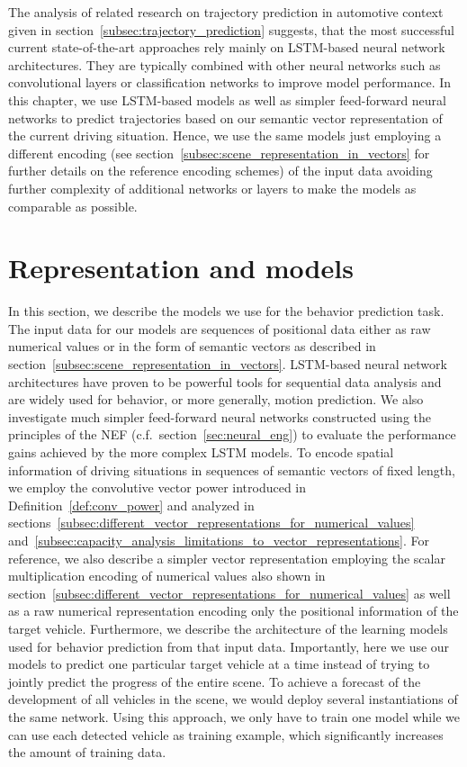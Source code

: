 The analysis of related research on trajectory prediction in automotive context given in section~\ref{subsec:trajectory_prediction} suggests, that the most successful current state-of-the-art approaches rely mainly on \ac{LSTM}-based neural network architectures.
They are typically combined with other neural networks such as convolutional layers or classification networks \parencite{Deo2018a} to improve model performance.
In this chapter, we use \ac{LSTM}-based models as well as simpler feed-forward neural networks to predict trajectories based on our semantic vector representation of the current driving situation.
Hence, we use the same models just employing a different encoding (see section~\ref{subsec:scene_representation_in_vectors} for further details on the reference encoding schemes) of the input data avoiding further complexity of additional networks or layers to make the models as comparable as possible.

\section{Representation and models}
\label{sec:repr_models}

In this section, we describe the models we use for the behavior prediction task.
The input data for our models are sequences of positional data either as raw numerical values or in the form of semantic vectors as described in section~\ref{subsec:scene_representation_in_vectors}.
\ac{LSTM}-based neural network architectures have proven to be powerful tools for sequential data analysis and are widely used for behavior, or more generally, motion prediction.
We also investigate much simpler feed-forward neural networks constructed using the principles of the \acf{NEF} (c.f.\ section~\ref{sec:neural_eng}) to evaluate the performance gains achieved by the more complex \ac{LSTM} models.
To encode spatial information of driving situations in sequences of semantic vectors of fixed length, we employ the convolutive vector power introduced in Definition~\ref{def:conv_power} and analyzed in sections~\ref{subsec:different_vector_representations_for_numerical_values} and~\ref{subsec:capacity_analysis_limitations_to_vector_representations}.
For reference, we also describe a simpler vector representation employing the scalar multiplication encoding of numerical values also shown in section~\ref{subsec:different_vector_representations_for_numerical_values} as well as a raw numerical representation encoding only the positional information of the target vehicle.  
Furthermore, we describe the architecture of the learning models used for behavior prediction from that input data.
Importantly, here we use our models to predict one particular target vehicle at a time instead of trying to jointly predict the progress of the entire scene.
To achieve a forecast of the development of all vehicles in the scene, we would deploy several instantiations of the same network.
Using this approach, we only have to train one model while we can use each detected vehicle as training example, which significantly increases the amount of training data. 

